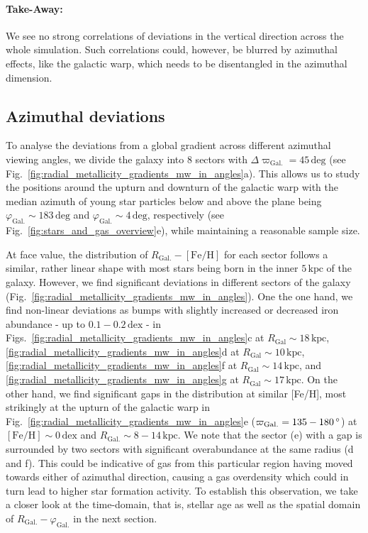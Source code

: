 \documentclass[fleqn,usenatbib]{mnras}
\begin{document}
\paragraph*{Take-Away:} We see no strong correlations of deviations in the vertical direction across the whole simulation. Such correlations could, however, be blurred by azimuthal effects, like the galactic warp, which needs to be disentangled in the azimuthal dimension.

\subsection{Azimuthal deviations}
\label{sec:coherence_azimuth_radial_metallicity_gradients}

To analyse the deviations from a global gradient across different azimuthal viewing angles, we divide the galaxy into 8 sectors with $\Delta \varpi_\mathrm{Gal.} = 45\,\mathrm{deg}$ (see Fig.~\ref{fig:radial_metallicity_gradients_mw_in_angles}a). This allows us to study the positions around the upturn and downturn of the galactic warp with the median azimuth of young star particles below and above the plane being $\varphi_\mathrm{Gal.} \sim 183\,\mathrm{deg}$ and $\varphi_\mathrm{Gal.} \sim 4\,\mathrm{deg}$, respectively (see Fig.~\ref{fig:stars_and_gas_overview}e), while maintaining a reasonable sample size.

At face value, the distribution of $R_\mathrm{Gal.}-\mathrm{[Fe/H]}$ for each sector follows a similar, rather linear shape with most stars being born in the inner $5\,\mathrm{kpc}$ of the galaxy. However, we find significant deviations in different sectors of the galaxy (Fig.~\ref{fig:radial_metallicity_gradients_mw_in_angles}). One the one hand, we find non-linear deviations as bumps with slightly increased or decreased iron abundance - up to $0.1-0.2\,\mathrm{dex}$ - in Figs.~\ref{fig:radial_metallicity_gradients_mw_in_angles}c at $R_\mathrm{Gal} \sim 18\,\mathrm{kpc}$, \ref{fig:radial_metallicity_gradients_mw_in_angles}d at $R_\mathrm{Gal} \sim 10\,\mathrm{kpc}$, \ref{fig:radial_metallicity_gradients_mw_in_angles}f at $R_\mathrm{Gal} \sim 14\,\mathrm{kpc}$, and \ref{fig:radial_metallicity_gradients_mw_in_angles}g at $R_\mathrm{Gal} \sim 17\,\mathrm{kpc}$. On the other hand, we find significant gaps in the distribution at similar [Fe/H], most strikingly at the upturn of the galactic warp in Fig.~\ref{fig:radial_metallicity_gradients_mw_in_angles}e ($\varpi_\mathrm{Gal.} = 135-180\,\mathrm{\degree}$) at $\mathrm{[Fe/H]} \sim 0\,\mathrm{dex}$ and $R_\mathrm{Gal.} \sim 8-14\,\mathrm{kpc}$. We note that the sector (e) with a gap is surrounded by two sectors with significant overabundance at the same radius (d and f). This could be indicative of gas from this particular region having moved towards either of azimuthal direction, causing a gas overdensity which could in turn lead to higher star formation activity. To establish this observation, we take a closer look at the time-domain, that is, stellar age as well as the spatial domain of $R_\mathrm{Gal.}-\varphi_\mathrm{Gal.}$ in the next section. 
\end{document}
